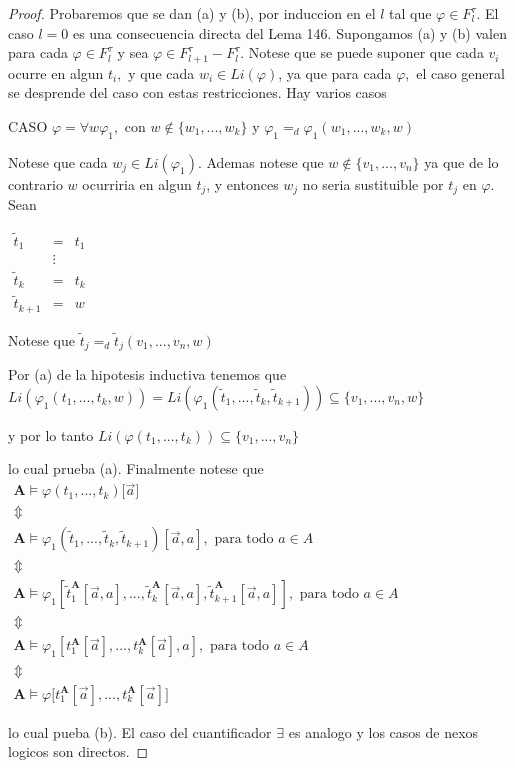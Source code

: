   \begin{proof}
    Probaremos que se dan (a) y (b), por induccion en el \(l\) tal que \(\varphi \in F_{l}^{\tau }.\) El caso \(l=0\) es una consecuencia directa del Lema 146. Supongamos (a) y (b) valen para cada \(\varphi \in F_{l}^{\tau } \) y sea \(\varphi \in F_{l+1}^{\tau }-F_{l}^{\tau }.\) Notese que se puede suponer que cada \(v_{i}\) ocurre en algun \(t_{i},\) y que cada \(w_{i}\in Li(\varphi )\), ya que para cada \(\varphi ,\) el caso general se desprende del caso con estas restricciones. Hay varios casos

    CASO \(\varphi =\forall w\varphi _{1},\) con \(w\not\in \{w_{1},...,w_{k}\}\) y \( \varphi _{1}=_{d}\varphi _{1}(w_{1},...,w_{k},w)\)

    Notese que cada \(w_{j}\in Li(\varphi _{1})\). Ademas notese que \( w\not\in \{v_{1},...,v_{n}\}\) ya que de lo contrario \(w\) ocurriria en algun \( t_{j}\), y entonces \(w_{j}\) no seria sustituible por \(t_{j}\) en \(\varphi \). Sean

    \(\displaystyle \begin{array}{ccc} \tilde{t}_{1} & = & t_{1} \\ & \vdots & \\ \tilde{t}_{k} & = & t_{k} \\ \tilde{t}_{k+1} & = & w \end{array} \)

    Notese que
    \(\displaystyle \tilde{t}_{j}=_{d}\tilde{t}_{j}(v_{1},...,v_{n},w) \)

    Por (a) de la hipotesis inductiva tenemos que
    \(\displaystyle Li(\varphi _{1}(t_{1},...,t_{k},w))=Li(\varphi _{1}(\tilde{t}_{1},...,\tilde{ t}_{k},\tilde{t}_{k+1}))\subseteq \{v_{1},...,v_{n},w\} \)

    y por lo tanto
    \(\displaystyle Li(\varphi (t_{1},...,t_{k}))\subseteq \{v_{1},...,v_{n}\} \)

    lo cual prueba (a). Finalmente notese que
    \(\displaystyle \begin{array}{c} \mathbf{A}\models \varphi (t_{1},...,t_{k})\mathbf{[}\vec{a}] \\ \Updownarrow \\ \mathbf{A}\models \varphi _{1}(\tilde{t}_{1},...,\tilde{t}_{k},\tilde{t} _{k+1})[\vec{a},a],\text{ para todo }a\in A \\ \Updownarrow \\ \mathbf{A}\models \varphi _{1}[\tilde{t}_{1}^{\mathbf{A}}[\vec{a},a],..., \tilde{t}_{k}^{\mathbf{A}}[\vec{a},a],\tilde{t}_{k+1}^{\mathbf{A}}[\vec{a} ,a]],\text{ para todo }a\in A \\ \Updownarrow \\ \mathbf{A}\models \varphi _{1}[t_{1}^{\mathbf{A}}[\vec{a}],...,t_{k}^{ \mathbf{A}}[\vec{a}],a],\text{ para todo }a\in A \\ \Updownarrow \\ \mathbf{A}\models \varphi \lbrack t_{1}^{\mathbf{A}}[\vec{a}],...,t_{k}^{ \mathbf{A}}[\vec{a}]] \end{array} \)

    lo cual pueba (b). El caso del cuantificador \(\exists \) es analogo y los casos de nexos logicos son directos.
  \end{proof}
